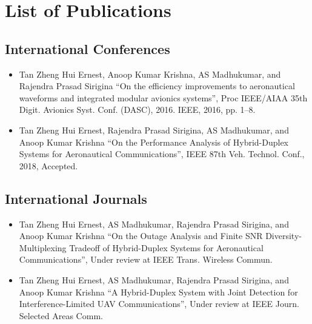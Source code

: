 \chapter* {List of Publications}

\section* {International Conferences}
\begin{itemize}
    \item Tan Zheng Hui Ernest, Anoop Kumar Krishna, AS Madhukumar, and Rajendra Prasad Sirigina ``On the efficiency improvements to aeronautical waveforms and integrated modular avionics systems'', Proc IEEE/AIAA 35th Digit. Avionics Syst. Conf. (DASC), 2016. IEEE,
2016, pp. 1–8.
		\item Tan Zheng Hui Ernest, Rajendra Prasad Sirigina, AS Madhukumar, and Anoop Kumar Krishna ``On the Performance Analysis of Hybrid-Duplex Systems for Aeronautical Communications'', IEEE 87th Veh. Technol. Conf., 2018, Accepted.
\end{itemize}

\section* {International Journals}
\begin{itemize}
    \item Tan Zheng Hui Ernest, AS Madhukumar, Rajendra Prasad Sirigina, and Anoop Kumar Krishna ``On the Outage Analysis and Finite SNR
Diversity-Multiplexing Tradeoff of Hybrid-Duplex Systems for Aeronautical Communications'', Under review at IEEE Trans. Wireless Commun.
		\item Tan Zheng Hui Ernest, AS Madhukumar, Rajendra Prasad Sirigina, and Anoop Kumar Krishna ``A Hybrid-Duplex System with Joint Detection
for Interference-Limited UAV Communications'', Under review at IEEE Journ. Selected Areas Comm.
\end{itemize}
